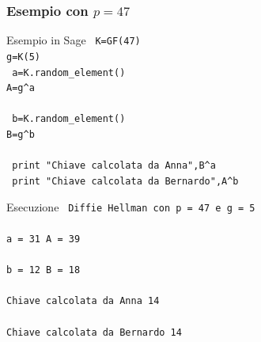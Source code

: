 \documentclass[]{beamer}
\begin{document}
\begin{frame}
\frametitle{Esempio con $p=47$}

\begin{minipage}{6cm}
\begin{block}{Esempio in Sage}
{\tt \color{brown}
K=GF(47)\\
g=K(5)\\
{\color{blue}
a=K.random\_element()\\
A=g\^{}a\\
}
\quad \\
{\color{red}
b=K.random\_element()\\
B=g\^{}b\\
}
\quad \\
{\color{blue} print "Chiave calcolata da Anna",B\^{}a}\\
{\color{red} print "Chiave calcolata da Bernardo",A\^{}b}\\
}
\end{block}
\end{minipage}
\quad
\begin{minipage}{5cm}
\begin{block}{Esecuzione}
{\tt \color{blue}
Diffie Hellman con p = 47   e g = 5\\
\quad \\
a = 31    A = 39\\
\quad \\
b = 12    B = 18\\
\quad \\
Chiave calcolata da Anna 14\\
\quad \\
Chiave calcolata da Bernardo 14\\
}
\end{block}
\end{minipage}
\end{frame}
\end{document}
